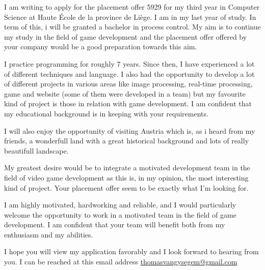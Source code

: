 \documentclass[10pt,stdletter,dateno]{newlfm}
\begin{document}
\begin{newlfm}

I am writing to apply for the placement offer 5929 for my third year in Computer Science
at \og Haute \'Ecole de la province de Li\`ege\fg. I am in my last year of study.
In term of this, i will be granted a bachelor in process control. My aim is to continue my study
in the field of game development and the placement offer offered by your company would be 
a good preparation towards this aim.

I practice programming for roughly 7 years. Since then,
I have experienced a lot of different techniques and language. I also had the opportunity to develop a lot
of different projects in various areas like image processing, real-time processing,
game and website (some of them were developed in a team) but my favourite kind of project is those in relation with game development. 
I am confident that my educational background is in keeping with your requirements.

I will also enjoy the opportunity of visiting Austria which is, as i heard from my friends, 
a wonderfull land with a great historical background and lots of really beautifull landscape.

My greatest desire would be to integrate a motivated development team in the field of video game development as 
this is, in my opinion, the most interesting kind of project. Your placement offer seem to be exactly what I'm looking for.

I am highly motivated, hardworking and reliable, and I would particularly
welcome the opportunity to work in a motivated team in the field of game development.
I am confident that your team will benefit both from my enthusiasm and my abilities.

I hope you will view my application favorably and I look forward to hearing from you.
I can be reached at this email address \href{mailto:thomasvangysegem@gmail.com}{thomasvangysegem@gmail.com}

\end{newlfm}
\end{document}

